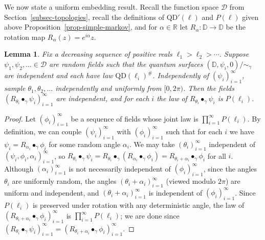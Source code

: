 \documentclass[a4paper]{article}
\numberwithin{equation}{section}
\newcommand{\D}{\mathbb{D}}
\newcommand{\R}{\mathbb{R}}
\newcommand{\cD}{\mathcal{D}}
\newcommand{\QD}{\mathrm{QD}}
\newtheorem{lemma}[theorem]{Lemma}
\theoremstyle{remark}
\numberwithin{equation}{section}
\begin{document}
We now state a uniform embedding result. Recall the function space $\cD$ from Section~\ref{subsec-topologies}, recall the definitions of $\QD'(\ell)$ and $P(\ell)$ given above Proposition~\ref{prop-simple-markov}, and for $\alpha \in \R$ let  $R_\alpha: \D \to \D$ be the rotation map $R_\alpha(z) = e^{i\alpha} z$. 
\begin{lemma}\label{lem-rotate-all}
    Fix a decreasing sequence of positive reals $\ell_1 > \ell_2 > \cdots$. Suppose $\psi_1, \psi_2, \dots \in \cD$ are random fields such that the quantum surfaces $(\D, \psi_i, 0)/{\sim_\gamma}$ are independent and each have law $\QD(\ell_i)^\#$. Independently of $(\psi_i)_{i=1}^\infty$, sample $\theta_1, \theta_2, \dots$ independently and uniformly from $[0,2\pi)$. Then the fields $(R_{\theta_i} \bullet_\gamma \psi_i)_{i=1}^\infty$ are independent, and for each $i$ the law of $R_{\theta_i} \bullet_\gamma \psi_i$ is $P(\ell_i)$.
\end{lemma}
\begin{proof}
    Let $(\phi_i)_{i=1}^\infty$ be a sequence of fields whose joint law is $\prod_{i=1}^\infty P(\ell_i)$. 
    By definition, we can couple $(\psi_i)_{i=1}^\infty$ with $(\phi_i)_{i=1}^\infty$ such that for each $i$ we have $\psi_i = R_{\alpha_i} \bullet_\gamma \phi_i$ for some random angle $\alpha_i$. We may take $(\theta_i)_{i=1}^\infty$ independent of $(\psi_i, \phi_i, \alpha_i)_{i=1}^\infty$, so $R_{\theta_i} \bullet_\gamma \psi_i  = R_{\theta_i} \bullet_\gamma (R_{\alpha_i} \bullet_\gamma \phi_i) = R_{\theta_i + \alpha_i} \bullet_\gamma \phi_i$ for all $i$. Although $(\alpha_i)_{i=1}^\infty$ is not necessarily independent of $(\phi_i)_{i=1}^\infty$, since the angles $\theta_i$ are uniformly random, the angles $(\theta_i + \alpha_i)_{i=1}^\infty$ (viewed modulo $2\pi$) are uniform and independent, and $(\theta_i + \alpha_i)_{i=1}^\infty$ is independent of $(\phi_i)_{i=1}^\infty$. Since $P(\ell_i)$ is preserved under rotation with any deterministic angle, the law of $(R_{\theta_i + \alpha_i} \bullet_\gamma \phi_i)_{i=1}^\infty$ is $\prod_{i=1}^\infty P(\ell_i)$; we are done since $(R_{\theta_i} \bullet_\gamma \psi_i)_{i=1}^\infty = (R_{\theta_i + \alpha_i} \bullet_\gamma \phi_i)_{i=1}^\infty$.
\end{proof}
\end{document}
